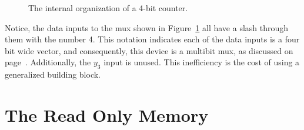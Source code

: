 \begin{figure}[ht]
\caption{The internal organization of a 4-bit counter.}
\label{fig:counter}
\end{figure}

Notice, the data inputs to the mux shown in Figure~\ref{fig:counter}
all have a slash through them with
the number 4.  This notation indicates each of the data inputs is a four
bit wide
vector, and consequently, this device is a multibit mux, as discussed on 
page~\pageref{page:wmu}.  Additionally, the $y_3$ input is unused.  This
inefficiency is the cost of using a generalized building block.  

\section{The Read Only Memory}
\pagebreak

